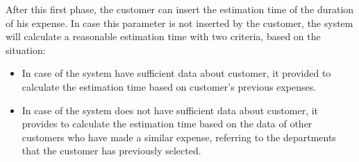 \documentclass{article}
\begin{document}
		After this first phase, the customer can insert the estimation time of the duration of his expense. In case this parameter is not inserted by the customer, the system will calculate a reasonable estimation time with two criteria, based on the situation:
		\begin{itemize}
			\item In case of the system have sufficient data about customer, it provided to calculate the estimation time based on customer's previous expenses.
			\item In case of the system does not have sufficient data about customer, it provides to calculate the estimation time based on the data of other customers who have made a similar expense, referring to the departments that the customer has previously selected.
		\end{itemize}
	
\end{document}
